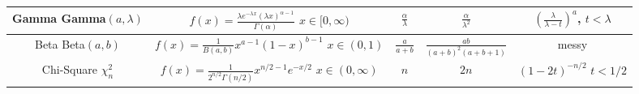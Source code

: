\documentclass{article}
\begin{document}
\begin{center}
\begin{tabular}{c|c|c|c|c}
\hline
\makecell{Gamma \\ Gamma$(a,\lambda)$} & \makecell{$f(x) = \frac{\lambda e^{-\lambda x} (\lambda x)^{\alpha-1}}{\Gamma(\alpha)}$ \\ $x \in [0,\infty)$} & $\frac{\alpha}{\lambda}$ & $\frac{\alpha}{\lambda^2}$ & \makecell{$\left(\frac{\lambda}{\lambda-t}\right)^a$,\\ $t < \lambda$} \\
\hline
\makecell{Beta \\ Beta$(a,b)$} & \makecell{$f(x) = \frac{1}{B(a,b)}x^{a-1}(1-x)^{b-1}$ \\ $x \in (0,1)$} & $\frac{a}{a+b}$ &$\frac{ab}{(a+b)^2(a+b+1)}$ & messy\\
\hline
\makecell{Chi-Square \\ $\chi^2_n$} & \makecell{$f(x) =\frac{1}{2^{n/2}\Gamma(n/2)}x^{n/2-1}e^{-x/2}$ \\ $x \in (0,\infty)$} &$n$ &$2n$ & \makecell{$(1-2t)^{-n/2}$ \\ $t < 1/2$ }\\

\end{tabular}

\end{center}
\end{document}
